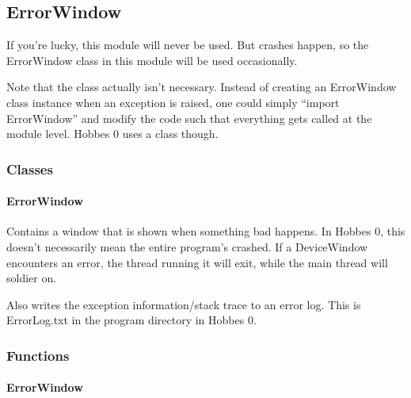 \documentclass[12pt,letterpaper]{article}
\begin{document}
%
%
\subsection{ErrorWindow}
\label{4.2}

If you're lucky, this module will never be used. But crashes happen, so the ErrorWindow class in this module will be used occasionally.

Note that the class actually isn't necessary. Instead of creating an ErrorWindow class instance when an exception is raised, one could simply ``import ErrorWindow'' and modify the code such that everything gets called at the module level. Hobbes 0 uses a class though.

\setcounter{subsubsection}{-1}



%
%
\subsubsection{Classes}
\label{4.2.0}

\setcounter{paragraph}{-1}



%
%
\paragraph{ErrorWindow}
\label{4.2.0.0}

Contains a window that is shown when something bad happens. In Hobbes 0, this doesn't necessarily mean the entire program's crashed. If a DeviceWindow encounters an error, the thread running it will exit, while the main thread will soldier on.

Also writes the exception information/stack trace to an error log. This is ErrorLog.txt in the program directory in Hobbes 0.



%
%
\subsubsection{Functions}
\label{4.2.1}

\setcounter{paragraph}{-1}



%
%
\paragraph{ErrorWindow}
\label{4.2.1.0}
\end{document}
